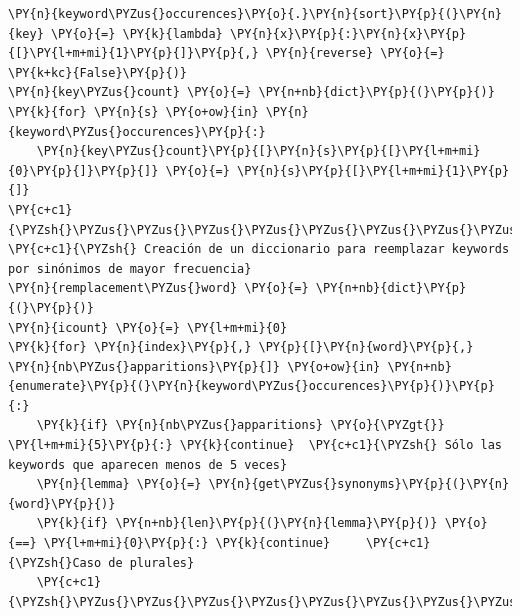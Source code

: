     \begin{tcolorbox}[breakable, size=fbox, boxrule=1pt, pad at break*=1mm,colback=cellbackground, colframe=cellborder]
\begin{Verbatim}[commandchars=\\\{\}]
\PY{n}{keyword\PYZus{}occurences}\PY{o}{.}\PY{n}{sort}\PY{p}{(}\PY{n}{key} \PY{o}{=} \PY{k}{lambda} \PY{n}{x}\PY{p}{:}\PY{n}{x}\PY{p}{[}\PY{l+m+mi}{1}\PY{p}{]}\PY{p}{,} \PY{n}{reverse} \PY{o}{=} \PY{k+kc}{False}\PY{p}{)}
\PY{n}{key\PYZus{}count} \PY{o}{=} \PY{n+nb}{dict}\PY{p}{(}\PY{p}{)}
\PY{k}{for} \PY{n}{s} \PY{o+ow}{in} \PY{n}{keyword\PYZus{}occurences}\PY{p}{:}
    \PY{n}{key\PYZus{}count}\PY{p}{[}\PY{n}{s}\PY{p}{[}\PY{l+m+mi}{0}\PY{p}{]}\PY{p}{]} \PY{o}{=} \PY{n}{s}\PY{p}{[}\PY{l+m+mi}{1}\PY{p}{]}
\PY{c+c1}{\PYZsh{}\PYZus{}\PYZus{}\PYZus{}\PYZus{}\PYZus{}\PYZus{}\PYZus{}\PYZus{}\PYZus{}\PYZus{}\PYZus{}\PYZus{}\PYZus{}\PYZus{}\PYZus{}\PYZus{}\PYZus{}\PYZus{}\PYZus{}\PYZus{}\PYZus{}\PYZus{}\PYZus{}\PYZus{}\PYZus{}\PYZus{}\PYZus{}\PYZus{}\PYZus{}\PYZus{}\PYZus{}\PYZus{}\PYZus{}\PYZus{}\PYZus{}\PYZus{}\PYZus{}\PYZus{}\PYZus{}\PYZus{}\PYZus{}\PYZus{}\PYZus{}\PYZus{}\PYZus{}\PYZus{}\PYZus{}\PYZus{}\PYZus{}\PYZus{}\PYZus{}\PYZus{}\PYZus{}\PYZus{}\PYZus{}\PYZus{}\PYZus{}\PYZus{}\PYZus{}\PYZus{}\PYZus{}\PYZus{}\PYZus{}\PYZus{}\PYZus{}\PYZus{}\PYZus{}\PYZus{}\PYZus{}\PYZus{}\PYZus{}\PYZus{}\PYZus{}\PYZus{}}
\PY{c+c1}{\PYZsh{} Creación de un diccionario para reemplazar keywords por sinónimos de mayor frecuencia}
\PY{n}{remplacement\PYZus{}word} \PY{o}{=} \PY{n+nb}{dict}\PY{p}{(}\PY{p}{)}
\PY{n}{icount} \PY{o}{=} \PY{l+m+mi}{0}
\PY{k}{for} \PY{n}{index}\PY{p}{,} \PY{p}{[}\PY{n}{word}\PY{p}{,} \PY{n}{nb\PYZus{}apparitions}\PY{p}{]} \PY{o+ow}{in} \PY{n+nb}{enumerate}\PY{p}{(}\PY{n}{keyword\PYZus{}occurences}\PY{p}{)}\PY{p}{:}
    \PY{k}{if} \PY{n}{nb\PYZus{}apparitions} \PY{o}{\PYZgt{}} \PY{l+m+mi}{5}\PY{p}{:} \PY{k}{continue}  \PY{c+c1}{\PYZsh{} Sólo las keywords que aparecen menos de 5 veces}
    \PY{n}{lemma} \PY{o}{=} \PY{n}{get\PYZus{}synonyms}\PY{p}{(}\PY{n}{word}\PY{p}{)}
    \PY{k}{if} \PY{n+nb}{len}\PY{p}{(}\PY{n}{lemma}\PY{p}{)} \PY{o}{==} \PY{l+m+mi}{0}\PY{p}{:} \PY{k}{continue}     \PY{c+c1}{\PYZsh{}Caso de plurales}
    \PY{c+c1}{\PYZsh{}\PYZus{}\PYZus{}\PYZus{}\PYZus{}\PYZus{}\PYZus{}\PYZus{}\PYZus{}\PYZus{}\PYZus{}\PYZus{}\PYZus{}\PYZus{}\PYZus{}\PYZus{}\PYZus{}\PYZus{}\PYZus{}\PYZus{}\PYZus{}\PYZus{}\PYZus{}\PYZus{}\PYZus{}\PYZus{}\PYZus{}\PYZus{}\PYZus{}\PYZus{}\PYZus{}\PYZus{}\PYZus{}\PYZus{}\PYZus{}\PYZus{}\PYZus{}\PYZus{}\PYZus{}\PYZus{}\PYZus{}\PYZus{}\PYZus{}\PYZus{}\PYZus{}\PYZus{}\PYZus{}\PYZus{}\PYZus{}\PYZus{}\PYZus{}\PYZus{}\PYZus{}\PYZus{}\PYZus{}\PYZus{}\PYZus{}\PYZus{}\PYZus{}\PYZus{}\PYZus{}\PYZus{}\PYZus{}\PYZus{}\PYZus{}\PYZus{}}

\end{Verbatim}
\end{tcolorbox}
